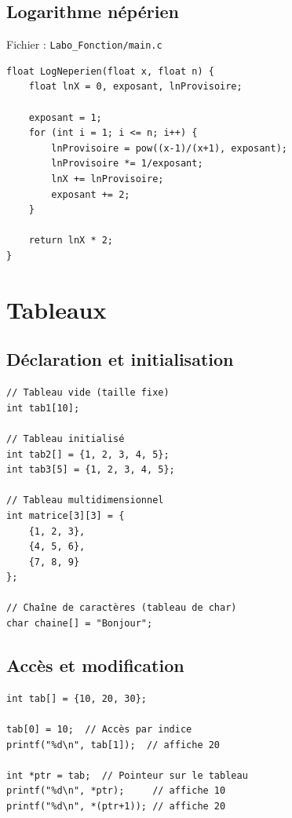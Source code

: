\documentclass[12pt,a4paper]{article}
\begin{document}
\subsection{Logarithme népérien}

Fichier : \texttt{Labo\_Fonction/main.c}

\begin{lstlisting}
float LogNeperien(float x, float n) {
    float lnX = 0, exposant, lnProvisoire;
    
    exposant = 1;
    for (int i = 1; i <= n; i++) {
        lnProvisoire = pow((x-1)/(x+1), exposant);
        lnProvisoire *= 1/exposant;
        lnX += lnProvisoire;
        exposant += 2;
    }
    
    return lnX * 2;
}
\end{lstlisting}

\section{Tableaux}

\subsection{Déclaration et initialisation}

\begin{lstlisting}
// Tableau vide (taille fixe)
int tab1[10];

// Tableau initialisé
int tab2[] = {1, 2, 3, 4, 5};
int tab3[5] = {1, 2, 3, 4, 5};

// Tableau multidimensionnel
int matrice[3][3] = {
    {1, 2, 3},
    {4, 5, 6},
    {7, 8, 9}
};

// Chaîne de caractères (tableau de char)
char chaine[] = "Bonjour";
\end{lstlisting}

\subsection{Accès et modification}

\begin{lstlisting}
int tab[] = {10, 20, 30};

tab[0] = 10;  // Accès par indice
printf("%d\n", tab[1]);  // affiche 20

int *ptr = tab;  // Pointeur sur le tableau
printf("%d\n", *ptr);     // affiche 10
printf("%d\n", *(ptr+1)); // affiche 20
\end{lstlisting}
\end{document}
